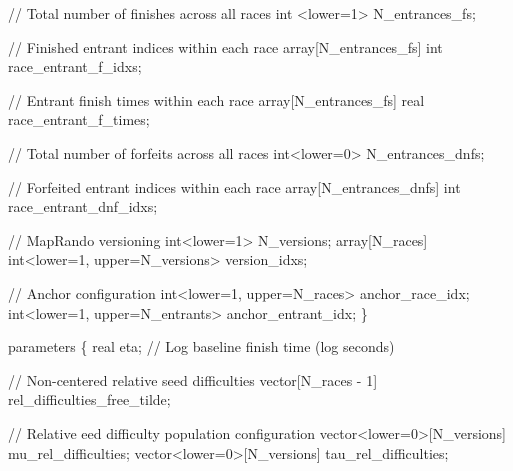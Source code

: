 \documentclass[
  letterpaper,
  DIV=11,
  numbers=noendperiod]{scrartcl}
\newenvironment{Shaded}{\begin{snugshade}}{\end{snugshade}}
\newcommand{\CommentTok}[1]{\textcolor[rgb]{0.37,0.37,0.37}{#1}}
\newcommand{\DataTypeTok}[1]{\textcolor[rgb]{0.68,0.00,0.00}{#1}}
\newcommand{\DecValTok}[1]{\textcolor[rgb]{0.68,0.00,0.00}{#1}}
\newcommand{\KeywordTok}[1]{\textcolor[rgb]{0.00,0.23,0.31}{#1}}
\newcommand{\NormalTok}[1]{\textcolor[rgb]{0.00,0.23,0.31}{#1}}
\begin{document}
\begin{codelisting}
\begin{Shaded}
\begin{Highlighting}[]
  \CommentTok{// Total number of finishes across all races}
  \DataTypeTok{int}\NormalTok{ \textless{}}\KeywordTok{lower}\NormalTok{=}\DecValTok{1}\NormalTok{\textgreater{} N\_entrances\_fs;}

  \CommentTok{// Finished entrant indices within each race}
  \DataTypeTok{array}\NormalTok{[N\_entrances\_fs] }\DataTypeTok{int}\NormalTok{ race\_entrant\_f\_idxs;}

  \CommentTok{// Entrant finish times within each race}
  \DataTypeTok{array}\NormalTok{[N\_entrances\_fs] }\DataTypeTok{real}\NormalTok{ race\_entrant\_f\_times;}

  \CommentTok{// Total number of forfeits across all races}
  \DataTypeTok{int}\NormalTok{\textless{}}\KeywordTok{lower}\NormalTok{=}\DecValTok{0}\NormalTok{\textgreater{} N\_entrances\_dnfs;}

  \CommentTok{// Forfeited entrant indices within each race}
  \DataTypeTok{array}\NormalTok{[N\_entrances\_dnfs] }\DataTypeTok{int}\NormalTok{ race\_entrant\_dnf\_idxs;}

  \CommentTok{// MapRando versioning}
  \DataTypeTok{int}\NormalTok{\textless{}}\KeywordTok{lower}\NormalTok{=}\DecValTok{1}\NormalTok{\textgreater{} N\_versions;}
  \DataTypeTok{array}\NormalTok{[N\_races] }\DataTypeTok{int}\NormalTok{\textless{}}\KeywordTok{lower}\NormalTok{=}\DecValTok{1}\NormalTok{, }\KeywordTok{upper}\NormalTok{=N\_versions\textgreater{} version\_idxs;}

  \CommentTok{// Anchor configuration}
  \DataTypeTok{int}\NormalTok{\textless{}}\KeywordTok{lower}\NormalTok{=}\DecValTok{1}\NormalTok{, }\KeywordTok{upper}\NormalTok{=N\_races\textgreater{} anchor\_race\_idx;}
  \DataTypeTok{int}\NormalTok{\textless{}}\KeywordTok{lower}\NormalTok{=}\DecValTok{1}\NormalTok{, }\KeywordTok{upper}\NormalTok{=N\_entrants\textgreater{} anchor\_entrant\_idx;}
\NormalTok{\}}

\KeywordTok{parameters}\NormalTok{ \{}
  \DataTypeTok{real}\NormalTok{ eta; }\CommentTok{// Log baseline finish time (log seconds)}

  \CommentTok{// Non{-}centered relative seed difficulties}
  \DataTypeTok{vector}\NormalTok{[N\_races {-} }\DecValTok{1}\NormalTok{] rel\_difficulties\_free\_tilde;}

  \CommentTok{// Relative eed difficulty population configuration}
  \DataTypeTok{vector}\NormalTok{\textless{}}\KeywordTok{lower}\NormalTok{=}\DecValTok{0}\NormalTok{\textgreater{}[N\_versions] mu\_rel\_difficulties;}
  \DataTypeTok{vector}\NormalTok{\textless{}}\KeywordTok{lower}\NormalTok{=}\DecValTok{0}\NormalTok{\textgreater{}[N\_versions] tau\_rel\_difficulties;}


\end{Highlighting}
\end{Shaded}
\end{codelisting}
\end{document}
